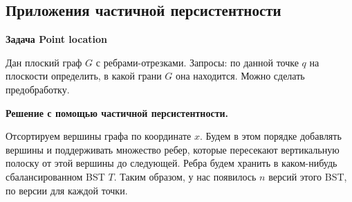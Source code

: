 \subsection*{Приложения частичной персистентности}

{\bf Задача Point location}

Дан плоский граф $G$ с ребрами-отрезками.
Запросы: по данной точке $q$ на плоскости определить, в какой грани $G$ она находится.
Можно сделать предобработку. 





{\bf Решение с помощью частичной персистентности.}

Отсортируем вершины графа по координате $x$. 
Будем в этом порядке добавлять вершины и поддерживать множество ребер, которые пересекают вертикальную полоску от этой вершины до следующей.
Ребра будем хранить в каком-нибудь сбалансированном BST $T$.
Таким образом, у нас появилось $n$ версий этого BST, по версии для каждой точки.

\begin{figure}[h] \centering
{}
\end{figure}

